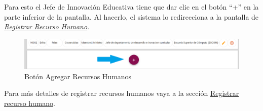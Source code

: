             Para esto el Jefe de Innovación Educativa tiene que dar clic en el botón “+” en la parte inferior de la pantalla. Al hacerlo, el sistema  lo redirecciona a la pantalla de \hyperlink{registrarRH}{\textit{Registrar Recurso Humano}}.

            \begin{figure}[H]
                \centering
                \hypertarget{add}{\includegraphics[width=0.7\linewidth]{images/SP1/BtnAgregar}}
                \caption{Botón Agregar Recursos Humanos}
                \label{add}
            \end{figure}

            Para más detalles de registrar recursos humanos vaya a la sección \hyperlink{registrarRH}{Registrar recurso humano}.

